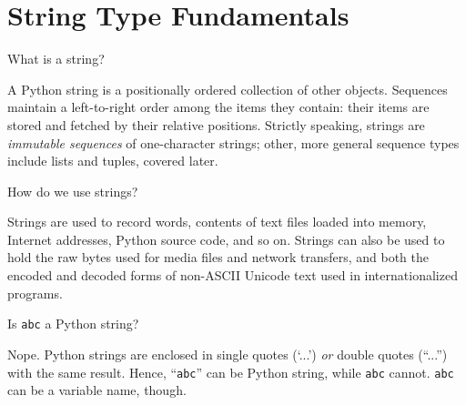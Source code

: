 \documentclass[a4paper,11pt]{book}
\newcommand{\question}[1]{%
    \begin{tcolorbox}[colback=comp_c!10,colframe=comp_c,sidebyside align=top,width=\linewidth,before skip=1ex]
        #1
    \end{tcolorbox}%
    \switchcolumn%
}
\newcommand{\note}[1]{%
    \begin{tcolorbox}[colback=white!0,colframe=white!10,width=\linewidth,before skip=1ex]
        #1
    \end{tcolorbox}         
}
\begin{document}
\section{String Type Fundamentals}

\begin{paracol}{2}
	\question{What is a string?}
	\note{A Python string is a positionally ordered collection of other objects. Sequences maintain a left-to-right order among the items they contain: their items are stored and fetched by their relative positions. Strictly speaking, strings are \textit{immutable sequences} of one-character strings; other, more general sequence types include lists and tuples, covered later.}
\end{paracol}

\begin{paracol}{2}
	\question{How do we use strings?}
	\note{Strings are used to record words, contents of text files loaded into memory, Internet addresses, Python source code, and so on. Strings can also be used to hold the raw bytes used for media files and network transfers, and both the encoded and decoded forms of non-ASCII Unicode text used in internationalized programs.}
\end{paracol}

\begin{paracol}{2}
	\question{Is \texttt{abc} a Python string?}
	\note{Nope. Python strings are enclosed in single quotes (`...') \textit{or} double quotes (``...'') with the same result. Hence, ``\texttt{abc}'' can be Python string, while \texttt{abc} cannot. \texttt{abc} can be a variable name, though.}
\end{paracol}
\end{document}
